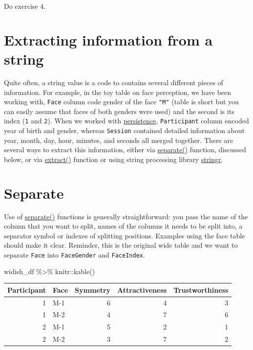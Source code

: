 \documentclass[
]{book}
\newenvironment{Shaded}{\begin{snugshade}}{\end{snugshade}}
\newcommand{\FunctionTok}[1]{\textcolor[rgb]{0.00,0.00,0.00}{#1}}
\newcommand{\NormalTok}[1]{#1}
\newcommand{\SpecialCharTok}[1]{\textcolor[rgb]{0.00,0.00,0.00}{#1}}
\begin{document}
Do exercise 4.

\hypertarget{extracting-information-from-a-string}{%
\section{Extracting information from a string}\label{extracting-information-from-a-string}}

Quite often, a string value is a code to contains several different pieces of information. For example, in the toy table on face perception, we have been working with, \texttt{Face} column code gender of the face \texttt{"M"} (table is short but you can easily assume that faces of both genders were used) and the second is its index (\texttt{1} and \texttt{2}). When we worked with \href{data/persistence.csv}{persistence}, \texttt{Participant} column encoded year of birth and gender, whereas \texttt{Session} contained detailed information about year, month, day, hour, minutes, and seconds all merged together. There are several ways to extract this information, either via \href{https://tidyr.tidyverse.org/reference/separate.html}{separate()} function, discussed below, or via \href{https://tidyr.tidyverse.org/reference/extract.html}{extract()} function or using string processing library \href{https://stringr.tidyverse.org/}{stringr}.

\hypertarget{separate}{%
\section{Separate}\label{separate}}

Use of \href{https://tidyr.tidyverse.org/reference/separate.html}{separate()} functions is generally straightforward: you pass the name of the column that you want to split, names of the columns it needs to be split into, a separator symbol or indexes of splitting positions. Examples using the face table should make it clear. Reminder, this is the original wide table and we want to separate \texttt{Face} into \texttt{FaceGender} and \texttt{FaceIndex}.

\begin{Shaded}
\begin{Highlighting}[]
\NormalTok{widish\_df }\SpecialCharTok{\%\textgreater{}\%}
\NormalTok{  knitr}\SpecialCharTok{::}\FunctionTok{kable}\NormalTok{()}
\end{Highlighting}
\end{Shaded}

\begin{tabular}{r|l|r|r|r}
\hline
Participant & Face & Symmetry & Attractiveness & Trustworthiness\\
\hline
1 & M-1 & 6 & 4 & 3\\
\hline
1 & M-2 & 4 & 7 & 6\\
\hline
2 & M-1 & 5 & 2 & 1\\
\hline
2 & M-2 & 3 & 7 & 2\\
\hline
\end{tabular}
\end{document}
